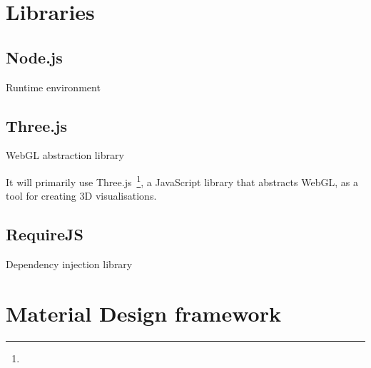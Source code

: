 \section{Libraries} {
\label{sec:libraries}
	
	\subsection{Node.js} {
	\label{sec:nodejs}
	
		Runtime environment

	}

	\subsection{Three.js} {
	\label{sec:threejs}
		
		WebGL abstraction library

		It will primarily use Three.js~\footnote{}, a JavaScript library that abstracts WebGL, as a tool for creating 3D visualisations. 

	}

	\subsection{RequireJS} {
	\label{sec:requirejs}
		
		Dependency injection library

	}

}

\section{Material Design framework} {
\label{sec:material_design_framework}
	

}

